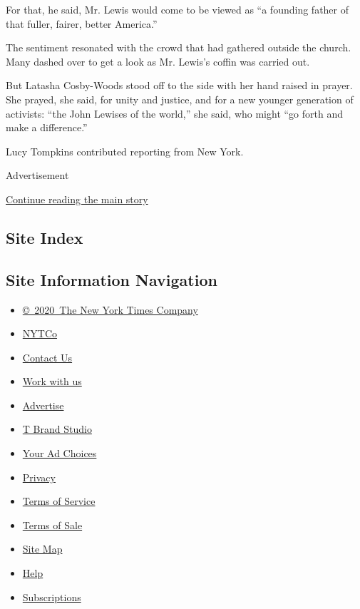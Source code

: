 For that, he said, Mr. Lewis would come to be viewed as ``a founding
father of that fuller, fairer, better America.''

The sentiment resonated with the crowd that had gathered outside the
church. Many dashed over to get a look as Mr. Lewis's coffin was carried
out.

But Latasha Cosby-Woods stood off to the side with her hand raised in
prayer. She prayed, she said, for unity and justice, and for a new
younger generation of activists: ``the John Lewises of the world,'' she
said, who might ``go forth and make a difference.''

Lucy Tompkins contributed reporting from New York.

Advertisement

\protect\hyperlink{after-bottom}{Continue reading the main story}

\hypertarget{site-index}{%
\subsection{Site Index}\label{site-index}}

\hypertarget{site-information-navigation}{%
\subsection{Site Information
Navigation}\label{site-information-navigation}}

\begin{itemize}
\tightlist
\item
  \href{https://help.nytimes.com/hc/en-us/articles/115014792127-Copyright-notice}{©~2020~The
  New York Times Company}
\end{itemize}

\begin{itemize}
\tightlist
\item
  \href{https://www.nytco.com/}{NYTCo}
\item
  \href{https://help.nytimes.com/hc/en-us/articles/115015385887-Contact-Us}{Contact
  Us}
\item
  \href{https://www.nytco.com/careers/}{Work with us}
\item
  \href{https://nytmediakit.com/}{Advertise}
\item
  \href{http://www.tbrandstudio.com/}{T Brand Studio}
\item
  \href{https://www.nytimes.com/privacy/cookie-policy\#how-do-i-manage-trackers}{Your
  Ad Choices}
\item
  \href{https://www.nytimes.com/privacy}{Privacy}
\item
  \href{https://help.nytimes.com/hc/en-us/articles/115014893428-Terms-of-service}{Terms
  of Service}
\item
  \href{https://help.nytimes.com/hc/en-us/articles/115014893968-Terms-of-sale}{Terms
  of Sale}
\item
  \href{https://spiderbites.nytimes.com}{Site Map}
\item
  \href{https://help.nytimes.com/hc/en-us}{Help}
\item
  \href{https://www.nytimes.com/subscription?campaignId=37WXW}{Subscriptions}
\end{itemize}
